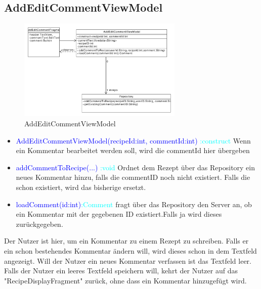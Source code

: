 \subsection{AddEditCommentViewModel}
\begin{figure}[H]
	\centering
	\includegraphics[width=0.7\textwidth]{pics/viewModel/AddEdit_Comment_ViewModel.pdf}%
	\caption{AddEditCommentViewModel}%
	\label{viewModel}%
\end{figure}
\begin{itemize}
	\item \textcolor{blue}{AddEditCommentViewModel(recipeId:int, commentId:int)} \textcolor{cyan}{:construct} Wenn ein Kommentar bearbeitet werden soll, wird die commentId hier übergeben
	
	\item \textcolor{blue}{addCommentToRecipe(...)} \textcolor{cyan}{:void}
	Ordnet dem Rezept über das Repository ein neues Kommentar hinzu, 
	falls die commentID noch nicht existiert. Falls die
	schon existiert, wird das bisherige ersetzt.
	
	\item \textcolor{blue}{loadComment(id:int)}\textcolor{cyan}{:Comment} 
	fragt über das Repository den Server an, ob ein Kommentar mit der 
	gegebenen ID existiert.Falls ja wird dieses zurückgegeben.
	
\end{itemize}
Der Nutzer ist hier, um ein Kommentar zu einem Rezept zu schreiben. Falls er ein schon bestehendes Kommentar ändern will, wird dieses schon in dem Textfeld angezeigt. Will der Nutzer ein neues Kommentar verfassen ist das Textfeld leer. Falls der Nutzer ein leeres Textfeld speichern will, kehrt der Nutzer auf das "RecipeDisplayFragment" zurück, ohne dass ein Kommentar hinzugefügt wird. 





